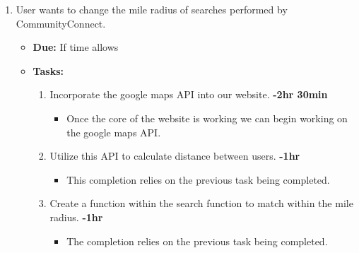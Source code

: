 \documentclass[12pt]{article}
\begin{document}
\begin{enumerate}
    \item User wants to change the mile radius of searches performed by CommunityConnect.
      \begin{itemize}
        \item \textbf{Due:} If time allows
        \item \textbf{Tasks:}
          \begin{enumerate}
            \item Incorporate the google maps API into our website. \textbf{-2hr 30min}
              \begin{itemize}
                \item Once the core of the website is working we can begin working on the google maps API.
              \end{itemize}
            \item Utilize this API to calculate distance between users. \textbf{-1hr}
              \begin{itemize}
                \item This completion relies on the previous task being completed.
              \end{itemize}
            \item Create a function within the search function to match within the mile radius. \textbf{-1hr}
              \begin{itemize}
                \item The completion relies on the previous task being completed.
              \end{itemize}
          \end{enumerate}
      \end{itemize}


\end{enumerate}
\end{document}
